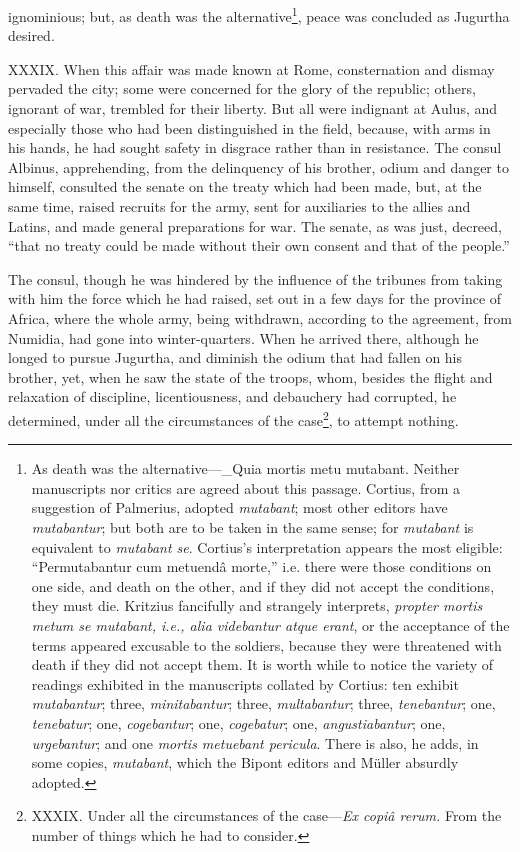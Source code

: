 ignominious; but, as death was the alternative\footnote{As death was the alternative—\_Quia mortis metu mutabant.
Neither manuscripts nor critics are agreed about this passage. Cortius,
from a suggestion of Palmerius, adopted \emph{mutabant}; most other editors
have \emph{mutabantur}; but both are to be taken in the same sense; for
\emph{mutabant} is equivalent to \emph{mutabant se}. Cortius's interpretation
appears the most eligible: ``Permutabantur cum metuendâ morte,'' i.e.
there were those conditions on one side, and death on the other, and
if they did not accept the conditions, they must die. Kritzius
fancifully and strangely interprets, \emph{propter mortis metum se mutabant,
i.e., alia videbantur atque erant}, or the acceptance of the terms
appeared excusable to the soldiers, because they were threatened with
death if they did not accept them. It is worth while to notice the
variety of readings exhibited in the manuscripts collated by Cortius:
ten exhibit \emph{mutabantur}; three, \emph{minitabantur}; three, \emph{multabantur};
three, \emph{tenebantur}; one, \emph{tenebatur}; one, \emph{cogebantur}; one,
\emph{cogebatur}; one, \emph{angustiabantur}; one, \emph{urgebantur}; and one \emph{mortis
metuebant pericula}. There is also, he adds, in some copies, \emph{mutabant},
which the Bipont editors and Müller absurdly adopted.}, peace was
concluded as Jugurtha desired.

XXXIX. When this affair was made known at Rome, consternation and
dismay pervaded the city; some were concerned for the glory of the
republic; others, ignorant of war, trembled for their liberty. But
all were indignant at Aulus, and especially those who had been
distinguished in the field, because, with arms in his hands, he had
sought safety in disgrace rather than in resistance. The consul
Albinus, apprehending, from the delinquency of his brother, odium and
danger to himself, consulted the senate on the treaty which had been
made, but, at the same time, raised recruits for the army, sent for
auxiliaries to the allies and Latins, and made general preparations
for war. The senate, as was just, decreed, ``that no treaty could be
made without their own consent and that of the people.''

The consul, though he was hindered by the influence of the tribunes
from taking with him the force which he had raised, set out in a few
days for the province of Africa, where the whole army, being
withdrawn, according to the agreement, from Numidia, had gone into
winter-quarters. When he arrived there, although he longed to pursue
Jugurtha, and diminish the odium that had fallen on his brother, yet,
when he saw the state of the troops, whom, besides the flight and
relaxation of discipline, licentiousness, and debauchery had
corrupted, he determined, under all the circumstances of the
case\footnote{XXXIX. Under all the circumstances of the case—\emph{Ex copiâ rerum.}
From the number of things which he had to consider.}, to attempt nothing.

